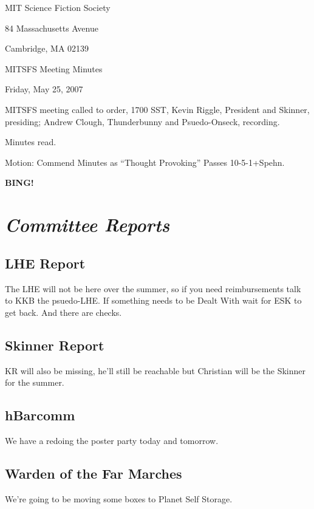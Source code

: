 \documentclass[10pt]{article}
\newcommand{\bing}{{\bf BING!} }
\newcommand{\goto}[1]{\bing \vskip 12pt \section*{{\em{#1}}}}
\begin{document}
\begin{center}

MIT Science Fiction Society

84 Massachusetts Avenue

Cambridge, MA 02139

\vspace{12pt}

MITSFS Meeting Minutes

Friday, May 25, 2007

\end{center}

\vspace{18pt}

\setlength{\parskip}{6pt}

\noindent
MITSFS meeting called to order, 1700 SST,
Kevin Riggle, President and Skinner, presiding; Andrew Clough, Thunderbunny and Psuedo-Onseck, recording.

Minutes read.

Motion:  Commend Minutes as ``Thought Provoking'' Passes 10-5-1+Spehn.

\goto{Committee Reports}

\subsection*{LHE Report}

The LHE will not be here over the summer, so if you need reimbursements talk to KKB the psuedo-LHE.  If something needs to be Dealt With wait for ESK to get back.  And there are checks.

\subsection*{Skinner Report}

KR will also be missing, he'll still be reachable but Christian will be the Skinner for the summer.

\subsection*{hBarcomm}

We have a redoing the poster party today and tomorrow.

\subsection{Warden of the Far Marches}

We're going to be moving some boxes to Planet Self Storage.  
\end{document}
